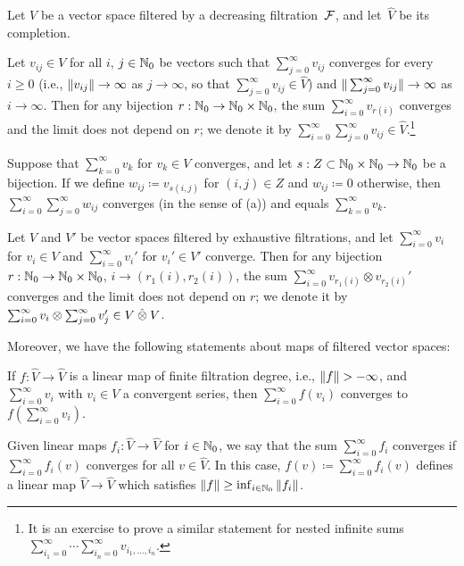 \documentclass[\MainFolder/Text.tex]{subfiles}
\begin{document}
\begin{Lemma}\label{Lem:TechLem}
Let $V$ be a vector space filtered by a decreasing filtration~$\mathcal{F}$, and let~$\hat{V}$ be its completion. 
\begin{ClaimList}
\item Let $v_{ij}\in V$ for all $i$, $j\in\mathbb{N}_0$ be vectors such that $\sum_{j=0}^\infty v_{ij}$ converges for every $i\ge 0$ (i.e., $\| v_{ij} \|\to\infty$ as $j\to\infty$, so that $\sum_{j=0}^\infty v_{ij}\in\hat{V}$) and $\| \sum_{j=0}^\infty v_{ij} \| \to \infty$ as $i\to \infty$. Then for any bijection $r: \mathbb{N}_0\rightarrow \mathbb{N}_0 \times \mathbb{N}_0$, the sum $\sum_{i=0}^\infty v_{r(i)}$ converges and the limit does not depend on $r$; we denote it by $\sum_{i=0}^\infty\sum_{j=0}^\infty v_{ij} \in \hat{V}$.\footnote{It is an exercise to prove a similar statement for nested infinite sums $\sum_{i_1=0}^\infty \dotsb \sum_{i_n=0}^\infty v_{i_1,\dotsc,i_n}$.}
\item Suppose that $\sum_{k=0}^\infty v_k$ for $v_k\in V$ converges, and let $s: Z\subset \mathbb{N}_0\times \mathbb{N}_0 \rightarrow \mathbb{N}_0$ be a bijection. If we define $w_{ij} \coloneqq v_{s(i,j)}$ for $(i,j)\in Z$ and $w_{ij} \coloneqq 0$ otherwise, then $\sum_{i=0}^\infty \sum_{j=0}^\infty w_{ij}$ converges (in the sense of (a)) and equals $\sum_{k=0}^\infty v_k$.
\item Let $V$ and $V'$ be vector spaces filtered by exhaustive filtrations, and let $\sum_{i=0}^\infty v_{i}$ for $v_i\in V$ and $\sum_{i=0}^\infty v_{i}'$ for $v_i'\in V'$ converge. Then for any bijection $r: \mathbb{N}_0 \rightarrow \mathbb{N}_0 \times \mathbb{N}_0$, $i\to (r_1(i),r_2(i))$, the sum $\sum_{i=0}^\infty v_{r_1(i)}\otimes v_{r_2(i)}'$ converges and the limit does not depend on $r$; we denote it by $\sum_{i=0}^\infty v_i \otimes \sum_{j=0}^\infty v_j' \in V\COtimes V$.
\end{ClaimList}
Moreover, we have the following statements about maps of filtered vector spaces:
\begin{ClaimList}[resume]
\item If $f: \hat{V}\rightarrow\hat{V}$ is a linear map of finite filtration degree, i.e., $\Norm{f}>-\infty$, and $\sum_{i=0}^\infty v_i$ with $v_i\in V$ a convergent series, then $\sum_{i=0}^\infty f(v_i)$ converges to $f(\sum_{i=0}^\infty v_i)$.
\item Given linear maps $f_i: \hat{V}\to \hat{V}$ for $i\in \mathbb{N}_0$, we say that the sum $\sum_{i=0}^\infty f_i$ converges if $\sum_{i=0}^\infty f_i(v)$ converges for all $v\in \hat{V}$. In this case, $f(v) \coloneqq \sum_{i=0}^\infty f_i(v)$ defines a linear map $\hat{V}\rightarrow\hat{V}$ which satisfies $\| f \|\ge \inf_{i\in\mathbb{N}_0} \| f_i \|$.
\end{ClaimList}
\end{Lemma}
\end{document}
